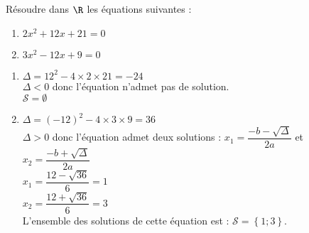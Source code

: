 \documentclass[a4paper,11pt,exos]{nsi} %
\begin{document}



\maketitle

\begin{exercice}
    Résoudre dans $\R$ les équations suivantes :
    \begin{multicols}{2}
        \begin{enumerate}
            \item $2x^2+12x+21=0$
	        \item $3x^2-12x+9=0$
        \end{enumerate}
    \end{multicols}
    
\end{exercice}

\begin{enumerate}
    \item $\Delta = 12^2-4\times2\times21=-24$\\$\Delta<0$ donc l'équation n'admet pas de solution.\\$\mathcal{S}=\emptyset$
\item $\Delta = (-12)^2-4\times3\times9=36$\\$\Delta>0$ donc l'équation admet deux solutions : $x_1 = \dfrac{-b-\sqrt{\Delta}}{2a}$ et $x_2 = \dfrac{-b+\sqrt{\Delta}}{2a}$\\$x_1 =\dfrac{12-\sqrt{36}}{6}=1$\\$x_2 =\dfrac{12+\sqrt{36}}{6}=3$\\L'ensemble des solutions de cette équation est : $\mathcal{S}=\left\{1 ; 3\right\}$.
\end{enumerate}
\end{document}
